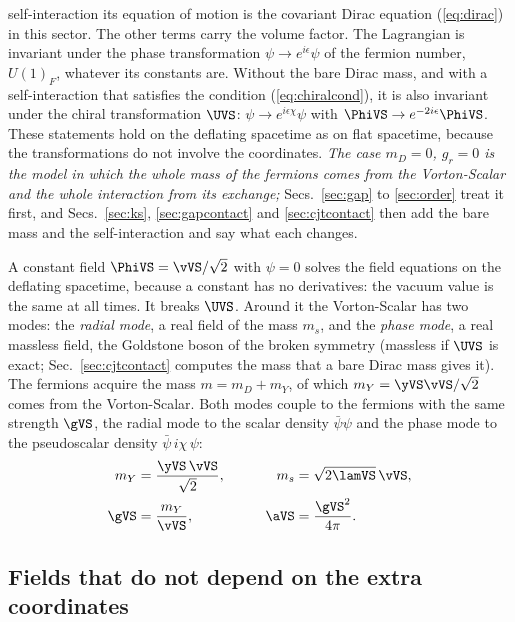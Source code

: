 self-interaction its equation of motion is the covariant Dirac equation (\ref{eq:dirac}) in this
sector. The other terms carry the volume factor.
The Lagrangian is invariant under the phase transformation $\psi\to e^{i\epsilon}\psi$ of the
fermion number, $U(1)_F$, whatever its constants are. Without the bare Dirac mass, and with a
self-interaction that satisfies the condition (\ref{eq:chiralcond}), it is also invariant under the
chiral transformation $\UVS$: $\psi\to e^{i\epsilon\chi}\psi$ with
$\PhiVS\to e^{-2i\epsilon}\PhiVS$. These statements hold on the deflating spacetime as on flat
spacetime, because the transformations do not involve the coordinates. \emph{The case $m_D=0$,
$g_r=0$ is the model in which the whole mass of the fermions comes from the Vorton-Scalar and the
whole interaction from its exchange;} Secs.~\ref{sec:gap} to \ref{sec:order} treat it first, and
Secs.~\ref{sec:ks}, \ref{sec:gapcontact} and \ref{sec:cjtcontact} then add the bare mass and the
self-interaction and say what each changes.

A constant field $\PhiVS=\vVS/\sqrt2$ with $\psi=0$ solves the field equations on the deflating
spacetime, because a constant has no derivatives: the vacuum value is the same at all times. It
breaks $\UVS$. Around it the Vorton-Scalar has two modes: the \emph{radial mode}, a real field of the
mass $m_s$, and the \emph{phase mode}, a real massless field, the Goldstone boson of the broken
symmetry (massless if $\UVS$ is exact; Sec.~\ref{sec:cjtcontact} computes the mass that a bare Dirac
mass gives it). The fermions acquire the mass $m=m_D+m_Y$, of which $m_Y=\yVS\vVS/\sqrt2$ comes from
the Vorton-Scalar. Both modes couple to the fermions with the same strength
$\gVS$, the radial mode to the scalar density $\bar\psi\psi$ and the phase mode to the pseudoscalar
density $\bar\psi\,i\chi\,\psi$:
\begin{equation}
\begin{aligned}
m_Y&=\frac{\yVS\,\vVS}{\sqrt2},&\qquad m_s&=\sqrt{2\lamVS}\,\vVS,\\
\gVS&=\frac{m_Y}{\vVS},&\qquad\aVS&=\frac{\gVS^{2}}{4\pi}.
\end{aligned}
\label{eq:masses}
\end{equation}

\subsection{Fields that do not depend on the extra coordinates}

